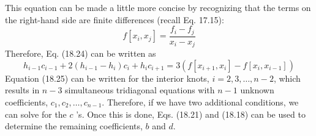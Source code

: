 \documentclass[../main.tex]{subfiles}
\begin{document}
This equation can be made a little more concise by recognizing that the terms on the right-hand side are finite differences (recall Eq. 17.15):
\begin{equation}
f\left[x_{i}, x_{j}\right]=\frac{f_{i}-f_{j}}{x_{i}-x_{j}}\nonumber
\end{equation}
Therefore, Eq. (18.24) can be written as
\begin{equation}
    \tag{18.25}
h_{i-1} c_{i-1}+2\left(h_{i-1}-h_{i}\right) c_{i}+h_{i} c_{i+1}=3\left(f\left[x_{i+1}, x_{i}\right]-f\left[x_{i}, x_{i-1}\right]\right)
\end{equation}
Equation (18.25) can be written for the interior knots, $i=2,3, \ldots, n-2$, which results in $n-3$ simultaneous tridiagonal equations with $n-1$ unknown coefficients, $c_{1}, c_{2}, \ldots, c_{n-1}$. Therefore, if we have two additional conditions, we can solve for the $c$ 's. Once this is done, Eqs. (18.21) and (18.18) can be used to determine the remaining coefficients, $b$ and $d$.
\end{document}
